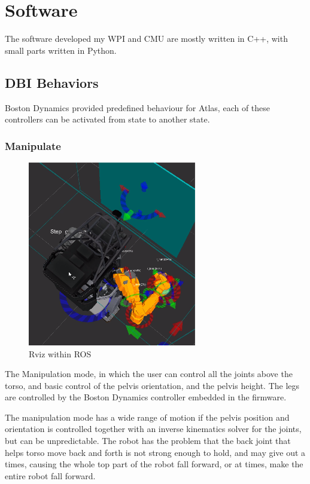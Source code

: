 \documentclass[12pt]{report}
\begin{document}
\section{Software}
The software developed my WPI and CMU are mostly written in C++, with small parts written in Python. 

\subsection{DBI Behaviors}
Boston Dynamics provided predefined behaviour for Atlas, each of these controllers can be activated from state to another state. 

\subsubsection{Manipulate}
\begin{figure}
  \begin{center}
    \includegraphics[scale=0.5]{images/align_to_wall.png}
  \end{center}
  \caption{Rviz within ROS}
\end{figure}
The Manipulation mode, in which the user can control all the joints above the torso, and basic control of the pelvis orientation, and the pelvis height. The legs are controlled by the Boston Dynamics controller embedded in the firmware.

The manipulation mode has a wide range of motion if the pelvis position and orientation is controlled together with an inverse kinematics solver for the joints, but can be unpredictable. The robot has the problem that the back joint that helps torso move back and forth is not strong enough to hold, and may give out a times, causing the whole top part of the robot fall forward, or at times, make the entire robot fall forward. 
\end{document}
